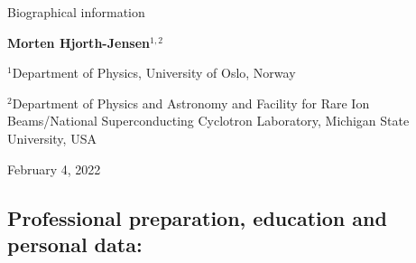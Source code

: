 \documentclass[%
oneside,                 %
final,                   %
10pt]{article}
\begin{document}

\newcommand{\exercisesection}[1]{\subsection*{#1}}






\thispagestyle{empty}

\begin{center}
{\LARGE\bf
\begin{spacing}{1.25}
Biographical  information
\end{spacing}
}
\end{center}


\begin{center}
{\bf Morten Hjorth-Jensen${}^{1, 2}$} \\ [0mm]
\end{center}

\begin{center}
\centerline{{\small ${}^1$Department of Physics, University of Oslo, Norway}}
\centerline{{\small ${}^2$Department of Physics and Astronomy and Facility for Rare Ion Beams/National Superconducting Cyclotron Laboratory, Michigan State University, USA}}
\end{center}
    

\begin{center}
February 4, 2022
\end{center}

\vspace{1cm}


\subsection*{Professional preparation, education  and personal data:}
\end{document}
